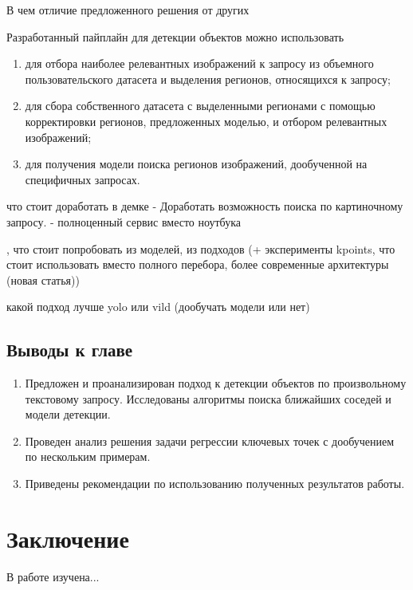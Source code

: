 \documentclass[a4paper,14pt]{article}
\begin{document}
    В чем отличие предложенного решения от других

    Разработанный пайплайн для детекции объектов можно использовать
    \begin{enumerate}
        [1)]
        \itemsep0em
        \item для отбора наиболее релевантных изображений к запросу из объемного пользовательского датасета и выделения регионов, относящихся к запросу;
        \item для сбора собственного датасета с выделенными регионами с помощью корректировки регионов, предложенных моделью, и отбором релевантных изображений;
        \item для получения модели поиска регионов изображений, дообученной на специфичных запросах.
    \end{enumerate}

    что стоит доработать в демке
    - Доработать возможность поиска по картиночному запросу.
    - полноценный сервис вместо ноутбука
    
    , что стоит попробовать из моделей, из подходов (+ эксперименты kpoints, что стоит использовать вместо полного перебора, более современные архитектуры (новая статья))
    
    какой подход лучше yolo или vild (дообучать модели или нет)

    \subsection{Выводы к главе \thesection}
    \begin{enumerate}
        \itemsep0em
        \item Предложен и проанализирован подход к детекции объектов по произвольному текстовому запросу. Исследованы алгоритмы поиска ближайших соседей и модели детекции.
        \item Проведен анализ решения задачи регрессии ключевых точек с дообучением по нескольким примерам.
        \item Приведены рекомендации по использованию полученных результатов работы.
    \end{enumerate}

    \newpage


    \section{Заключение}

    В работе изучена...
\end{document}
